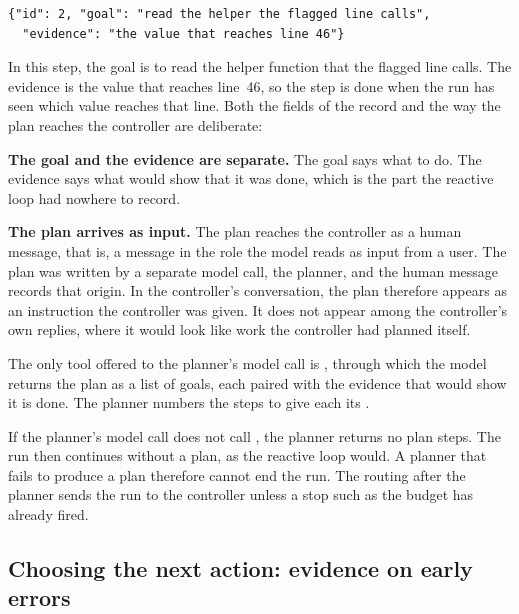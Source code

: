 \begin{lstlisting}[basicstyle=\ttfamily\footnotesize, caption={One plan step for the worked
alert.}, label=lst:planning-step]
{"id": 2, "goal": "read the helper the flagged line calls",
  "evidence": "the value that reaches line 46"}
\end{lstlisting}

In this step, the goal is to read the helper function that the flagged line calls. The evidence is
the value that reaches line~46, so the step is done when the run has seen which value reaches that
line. Both the fields of the record and the way the plan reaches the controller are deliberate:
\bi
\item \textbf{The goal and the evidence are separate.} The goal says what to do. The evidence says
what would show that it was done, which is the part the reactive loop had nowhere to record.
\item \textbf{The plan arrives as input.} The plan reaches the controller as a human message, that
is, a message in the role the model reads as input from a user. The plan was written by a separate
model call, the planner, and the human message records that origin. In the controller's
conversation, the plan therefore appears as an instruction the controller was given. It does not
appear among the controller's own replies, where it would look like work the controller had planned
itself.
\ei

The only tool offered to the planner's model call is , through which the
model returns the plan as a list of goals, each paired with the evidence that would show it is done.
The planner numbers the steps to give each its .

If the planner's model call does not call , the planner returns no plan steps.
The run then continues without a plan, as the reactive loop would. A planner that fails to produce a
plan therefore cannot end the run. The routing after the planner sends the run to the controller
unless a stop such as the budget has already fired.

\subsection{Choosing the next action: evidence on early errors}
\label{sec:planning-wang}

